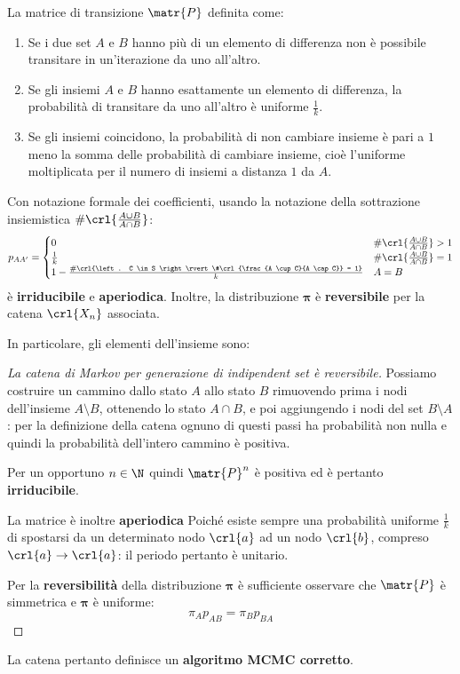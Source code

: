 \documentclass[\main/main.tex]{subfiles}
\begin{document}
\begin{theorem}
	La matrice di transizione \(\matr{P}\) definita come:
	\begin{enumerate}
		\item Se i due set \(A\) e \(B\) hanno più di un elemento di differenza non è possibile transitare in un'iterazione da uno all'altro.
		\item Se gli insiemi \(A\) e \(B\) hanno esattamente un elemento di differenza, la probabilità di transitare da uno all'altro è uniforme \(\frac{1}{k}\).
		\item Se gli insiemi coincidono, la probabilità di non cambiare insieme è pari a \(1\) meno la somma delle probabilità di cambiare insieme, cioè l'uniforme moltiplicata per il numero di insiemi a distanza \(1\) da \(A\).
	\end{enumerate}
	Con notazione formale dei coefficienti, usando la notazione della sottrazione insiemistica \(\#\crl{\frac{A \cup B}{A \cap B}}\):
	\[
		p_{AA'} = \begin{cases}
			0                                                                                       & \#\crl{\frac{A \cup B}{A \cap B}} > 1 \\
			\frac{1}{k}                                                                             & \#\crl{\frac{A \cup B}{A \cap B}} = 1 \\
			1 - \frac{\#\crl{\left. C \in S \right\rvert \#\crl{\frac{A \cup C}{A \cap C}} = 1}}{k} & A = B
		\end{cases}
	\]
	è \textbf{irriducibile} e \textbf{aperiodica}. Inoltre, la distribuzione \(\bm{\pi} \) è \textbf{reversibile} per la catena \(\crl{X_n}\) associata.

	In particolare, gli elementi dell'insieme sono:
\end{theorem}

\begin{proof}[La catena di Markov per generazione di indipendent set è reversibile]
	Possiamo costruire un cammino dallo stato \(A\) allo stato \(B\) rimuovendo prima i nodi dell'insieme \(A\setminus B\), ottenendo lo stato \(A\cap B\), e poi aggiungendo i nodi del set \(B \setminus A\): per la definizione della catena ognuno di questi passi ha probabilità non nulla e quindi la probabilità dell'intero cammino è positiva.

	Per un opportuno \(n \in \N \) quindi \(\matr{P}^n\) è positiva ed è pertanto \textbf{irriducibile}.

	La matrice è inoltre \textbf{aperiodica} Poiché esiste sempre una probabilità uniforme \(\frac{1}{k}\) di spostarsi da un determinato nodo \(\crl{a}\) ad un nodo \(\crl{b}\), compreso \(\crl{a}\rightarrow \crl{a}\): il periodo pertanto è unitario.

	Per la \textbf{reversibilità} della distribuzione \(\bm{\pi} \) è sufficiente osservare che \(\matr{P}\) è simmetrica e \(\bm{\pi} \) è uniforme:
	\[
		\pi_A p_{AB} = \pi_B p_{BA}
	\]
\end{proof}

La catena pertanto definisce un \textbf{algoritmo MCMC corretto}.
\end{document}
